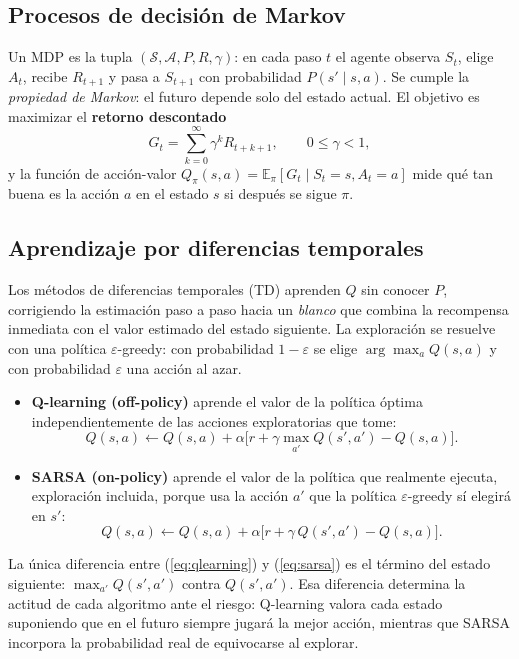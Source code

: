 \documentclass[11pt]{article}
\begin{document}
\subsection{Procesos de decisión de Markov}

Un MDP es la tupla $(\mathcal{S}, \mathcal{A}, P, R, \gamma)$: en cada paso $t$
el agente observa $S_t$, elige $A_t$, recibe $R_{t+1}$ y pasa a $S_{t+1}$ con
probabilidad $P(s' \mid s, a)$. Se cumple la \emph{propiedad de Markov}: el
futuro depende solo del estado actual. El objetivo es maximizar el
\textbf{retorno descontado}
\begin{equation}
G_t = \sum_{k=0}^{\infty} \gamma^k R_{t+k+1}, \qquad 0 \le \gamma < 1,
\label{eq:retorno}
\end{equation}
y la función de acción-valor $Q_\pi(s,a) = \mathbb{E}_\pi[G_t \mid S_t = s, A_t = a]$
mide qué tan buena es la acción $a$ en el estado $s$ si después se sigue $\pi$.

\subsection{Aprendizaje por diferencias temporales}

Los métodos de diferencias temporales (TD) aprenden $Q$ sin conocer $P$,
corrigiendo la estimación paso a paso hacia un \emph{blanco} que combina la
recompensa inmediata con el valor estimado del estado siguiente. La exploración
se resuelve con una política $\varepsilon$-greedy: con probabilidad
$1-\varepsilon$ se elige $\arg\max_a Q(s,a)$ y con probabilidad $\varepsilon$
una acción al azar.

\begin{itemize}
    \item \textbf{Q-learning (off-policy)} aprende el valor de la política óptima
    independientemente de las acciones exploratorias que tome:
    \begin{equation}
    Q(s,a) \leftarrow Q(s,a) + \alpha\Big[r + \gamma \max_{a'} Q(s',a') - Q(s,a)\Big].
    \label{eq:qlearning}
    \end{equation}
    \item \textbf{SARSA (on-policy)} aprende el valor de la política que
    realmente ejecuta, exploración incluida, porque usa la acción $a'$ que la
    política $\varepsilon$-greedy sí elegirá en $s'$:
    \begin{equation}
    Q(s,a) \leftarrow Q(s,a) + \alpha\Big[r + \gamma\, Q(s',a') - Q(s,a)\Big].
    \label{eq:sarsa}
    \end{equation}
\end{itemize}
La única diferencia entre (\ref{eq:qlearning}) y (\ref{eq:sarsa}) es el término
del estado siguiente: $\max_{a'}Q(s',a')$ contra $Q(s',a')$. Esa diferencia
determina la actitud de cada algoritmo ante el riesgo: Q-learning valora cada
estado suponiendo que en el futuro siempre jugará la mejor acción, mientras que
SARSA incorpora la probabilidad real de equivocarse al explorar.
\end{document}
